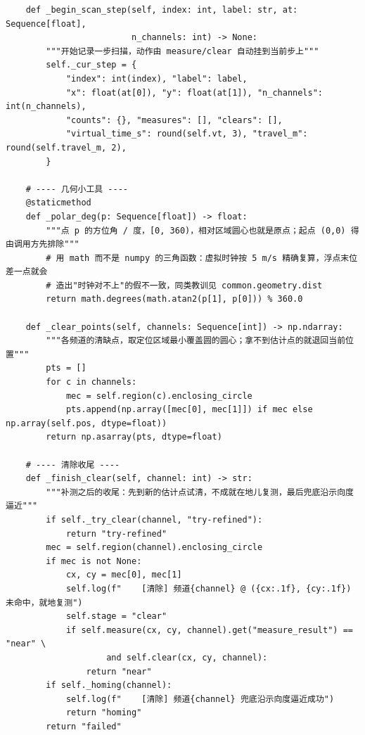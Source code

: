 \documentclass[UTF8, zihao=5,AutoFakeBold=2]{ctexart}
\begin{document}
\begin{lstlisting}
    def _begin_scan_step(self, index: int, label: str, at: Sequence[float],
                         n_channels: int) -> None:
        """开始记录一步扫描，动作由 measure/clear 自动挂到当前步上"""
        self._cur_step = {
            "index": int(index), "label": label,
            "x": float(at[0]), "y": float(at[1]), "n_channels": int(n_channels),
            "counts": {}, "measures": [], "clears": [],
            "virtual_time_s": round(self.vt, 3), "travel_m": round(self.travel_m, 2),
        }

    # ---- 几何小工具 ----
    @staticmethod
    def _polar_deg(p: Sequence[float]) -> float:
        """点 p 的方位角 / 度，[0, 360)，相对区域圆心也就是原点；起点 (0,0) 得由调用方先排除"""
        # 用 math 而不是 numpy 的三角函数：虚拟时钟按 5 m/s 精确复算，浮点末位差一点就会
        # 造出"时钟对不上"的假不一致，同类教训见 common.geometry.dist
        return math.degrees(math.atan2(p[1], p[0])) % 360.0

    def _clear_points(self, channels: Sequence[int]) -> np.ndarray:
        """各频道的清缺点，取定位区域最小覆盖圆的圆心；拿不到估计点的就退回当前位置"""
        pts = []
        for c in channels:
            mec = self.region(c).enclosing_circle
            pts.append(np.array([mec[0], mec[1]]) if mec else np.array(self.pos, dtype=float))
        return np.asarray(pts, dtype=float)

    # ---- 清除收尾 ----
    def _finish_clear(self, channel: int) -> str:
        """补测之后的收尾：先到新的估计点试清，不成就在地儿复测，最后兜底沿示向度逼近"""
        if self._try_clear(channel, "try-refined"):
            return "try-refined"
        mec = self.region(channel).enclosing_circle
        if mec is not None:
            cx, cy = mec[0], mec[1]
            self.log(f"    [清除] 频道{channel} @ ({cx:.1f}, {cy:.1f}) 未命中，就地复测")
            self.stage = "clear"
            if self.measure(cx, cy, channel).get("measure_result") == "near" \
                    and self.clear(cx, cy, channel):
                return "near"
        if self._homing(channel):
            self.log(f"    [清除] 频道{channel} 兜底沿示向度逼近成功")
            return "homing"
        return "failed"
	\end{lstlisting}
\end{document}
